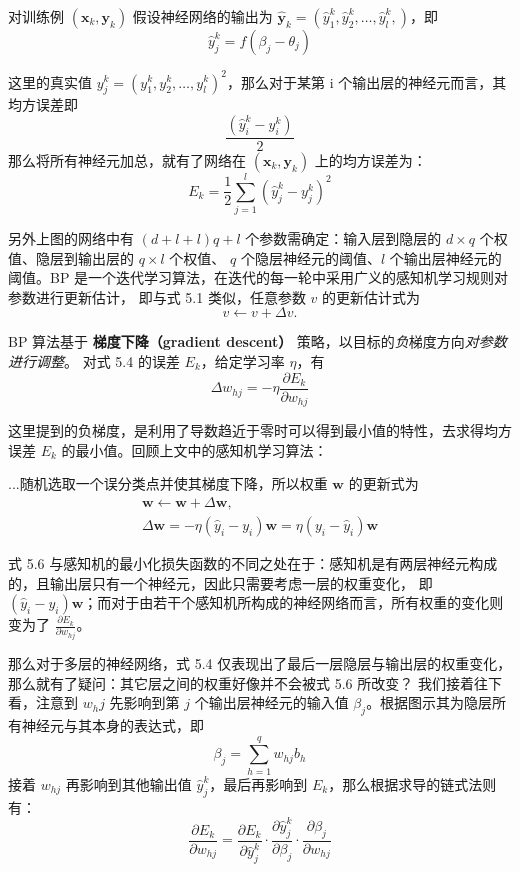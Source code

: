 \documentclass[../studies-ml.tex]{subfiles}
\begin{document}
对训练例 $(\pmb{x}_k, \pmb{y}_k)$ 假设神经网络的输出为 $\hat{\pmb{y}}_k = (\hat{y}_1^k,\hat{y}_2^k,\dots,\hat{y}_l^k,)$，即
\begin{equation}
  \hat{y}_j^k = f(\beta_j - \theta_j)
\end{equation}

这里的真实值 $y_j^k = (y_1^k,y_2^k,\dots,y_l^k)^2$，那么对于某第 i 个输出层的神经元而言，其均方误差即
\[
  \frac{(\hat{y}_i^k - y_i^k)}{2}
\]
那么将所有神经元加总，就有了网络在 $(\pmb{x}_k, \pmb{y}_k)$ 上的均方误差为：
\begin{equation}
  E_k = \frac{1}{2} \sum_{j=1}^{l} (\hat{y}_j^k - y_j^k)^2
\end{equation}

另外上图的网络中有 $(d + l + l) q + l$ 个参数需确定：输入层到隐层的 $d \times q$ 个权值、隐层到输出层的 $q \times l$ 个权值、
$q$ 个隐层神经元的阈值、$l$ 个输出层神经元的阈值。BP 是一个迭代学习算法，在迭代的每一轮中采用广义的感知机学习规则对参数进行更新估计，
即与式 5.1 类似，任意参数 $v$ 的更新估计式为
\begin{equation}
  v \leftarrow v + \Delta v.
\end{equation}

BP 算法基于 \textbf{梯度下降（gradient descent）} 策略，以目标的\textit{负}梯度方向\textit{对参数进行调整}。
对式 5.4 的误差 $E_k$，给定学习率 $\eta$，有
\begin{equation}
  \Delta w_{hj} = -\eta \frac{\partial E_k}{\partial w_{hj}}
\end{equation}

这里提到的负梯度，是利用了导数趋近于零时可以得到最小值的特性，去求得均方误差 $E_k$ 的最小值。回顾上文中的感知机学习算法：
\begin{aquote}
  ...随机选取一个误分类点并使其梯度下降，所以权重 $\pmb{w}$ 的更新式为
  \begin{gather*}
    \pmb{w} \leftarrow \pmb{w} + \Delta \pmb{w}, \\
    \Delta \pmb{w} = -\eta (\hat{y}_i - y_i) \pmb{w} = \eta (y_i - \hat{y}_i) \pmb{w}
  \end{gather*}
\end{aquote}

式 5.6 与感知机的最小化损失函数的不同之处在于：感知机是有两层神经元构成的，且输出层只有一个神经元，因此只需要考虑一层的权重变化，
即 $(\hat{y}_i - y_i) \pmb{w}$；而对于由若干个感知机所构成的神经网络而言，所有权重的变化则变为了
$\frac{\partial E_k}{\partial w_{hj}}$。

那么对于多层的神经网络，式 5.4 仅表现出了最后一层隐层与输出层的权重变化，那么就有了疑问：其它层之间的权重好像并不会被式 5.6 所改变？
我们接着往下看，注意到 $w_hj$ 先影响到第 $j$ 个输出层神经元的输入值 $\beta_j$。根据图示其为隐层所有神经元与其本身的表达式，即
\[ \beta_j = \sum_{h=1}^{q} w_{hj} b_h \]
接着 $w_{hj}$ 再影响到其他输出值 $\hat{y}_j^k$，最后再影响到 $E_k$，那么根据求导的链式法则有：
\begin{equation}
  \frac{\partial E_k}{\partial w_{hj}} =
  \frac{\partial E_k}{\partial \hat{y}_j^k} \cdot
  \frac{\partial \hat{y}_j^k}{\partial \beta_j} \cdot
  \frac{\partial \beta_j}{\partial w_{hj}}
\end{equation}
\end{document}
